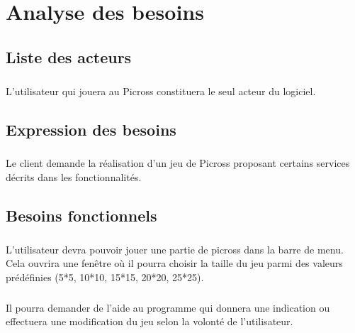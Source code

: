 \chapter{Analyse des besoins} 


\section{Liste des acteurs}
        \paragraph*{}
        L'utilisateur qui jouera au Picross constituera le seul acteur du logiciel.


\section{Expression des besoins}
        \paragraph*{}
        Le client demande la réalisation d'un jeu de Picross proposant certains services décrits dans les fonctionnalités. 



\section{Besoins fonctionnels}
        \paragraph*{}
        L'utilisateur devra pouvoir jouer une partie de picross dans la barre de menu. Cela ouvrira une fenêtre où il pourra choisir la taille du jeu  parmi des valeurs prédéfinies (5*5, 10*10, 15*15, 20*20, 25*25). 
        \paragraph*{}
        Il pourra demander de l'aide au programme qui donnera une indication ou effectuera une modification du jeu selon la volonté de l'utilisateur.
